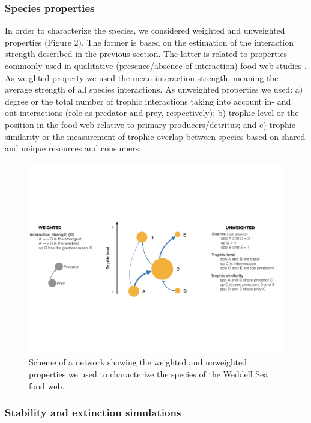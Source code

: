\documentclass[gc, manuscript]{copernicus}
\begin{document}
\subsubsection{Species properties}

In order to characterize the species, we considered weighted and
unweighted properties (Figure 2). The former is based on the estimation
of the interaction strength described in the previous section. The
latter is related to properties commonly used in qualitative
(presence/absence of interaction) food web studies
\citep{Martinez1991, Dunne2002, Borrelli2014}. As weighted property we
used the mean interaction strength, meaning the average strength of all
species interactions. As unweighted properties we used: a) degree or the
total number of trophic interactions taking into account in- and
out-interactions (role as predator and prey, respectively); b) trophic
level or the position in the food web relative to primary
producers/detritus; and c) trophic similarity or the measurement of
trophic overlap between species based on shared and unique resources and
consumers.

\begin{figure}
\includegraphics[width=12cm]{ToyFoodWeb} \caption{Scheme of a network showing the weighted and unweighted properties we used to characterize the species of the Weddell Sea food web.}\label{fig:unnamed-chunk-2}
\end{figure}

\subsubsection{Stability and extinction simulations}
\end{document}
